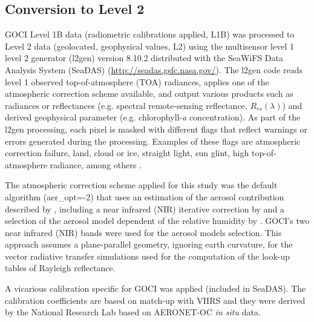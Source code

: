 \documentclass[onecolumn,3p,letterpaper,11pt]{elsarticle}
\begin{document}
\subsection{Conversion to Level 2}
GOCI Level 1B data (radiometric calibrations applied, L1B) was processed to Level 2 data (geolocated, geophysical values, L2) using the multisensor level 1 level 2 generator (l2gen) version 8.10.2 distributed with the SeaWiFS Data Analysis System (SeaDAS) (\url{http://seadas.gsfc.nasa.gov/}). The l2gen code reads level 1 observed top-of-atmosphere (TOA) radiances, applies one of the atmospheric correction scheme available, and output various products such as radiances or reflectances (e.g.  spectral remote-sensing reflectance, $R_{rs}(\lambda)$) and derived geophysical parameter (e.g. chlorophyll-{\it a} concentration). As part of the l2gen processing, each pixel is masked with different flags that reflect warnings or errors generated during the processing. Examples of these flags are atmospheric correction failure, land, cloud or ice, straight light, sun glint, high top-of-atmosphere radiance, among others \citep{Bailey2006}. 

The atmospheric correction scheme applied for this study was the default algorithm ({\ttfamily aer\_opt=-2}) that uses an estimation of the aerosol contribution described by \citet{Gordon1994}, including a near infrared (NIR) iterative correction by \citet{Bailey2010} and a selection of the aerosol model dependent of the relative humidity by \citet{Ahmad2010}. GOCI's two near infrared (NIR) bands were used for the aerosol models selection. This approach assumes a plane-parallel geometry, ignoring earth curvature, for the vector radiative transfer simulations used for the computation of the { look-up tables of Rayleigh reflectance}.  

A vicarious calibration specific for GOCI was applied (included in SeaDAS). The calibration coefficients are based on match-up with VIIRS and they were derived by the National Research Lab based on AERONET-OC {\it in situ} data.
\end{document}
